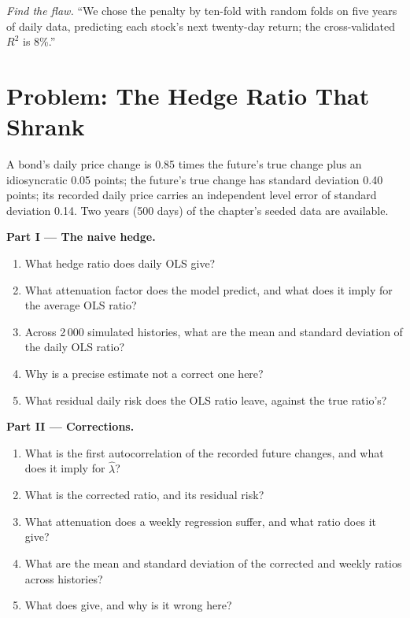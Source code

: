 \begin{exercise}[$\star\star\star$]\label{exo:qm:linear-models-under-stress:8}
\emph{Find the flaw.} ``We chose the  penalty by ten-fold  with random folds on five years of daily data, predicting each
stock's next twenty-day return; the cross-validated $R^2$ is 8\%.''
\end{exercise}

\section{Problem: The Hedge Ratio That Shrank}

\begin{problem}\label{pb:qm:linear-models-under-stress:1}
A bond's daily price change is 0.85 times the future's true change plus an idiosyncratic 0.05 points; the future's true change has standard
deviation 0.40 points; its recorded daily price carries an independent level error of standard deviation 0.14. Two years (500 days) of the
chapter's seeded data are available.

\medskip\noindent\textbf{Part I --- The naive hedge.}
\begin{enumerate}
\item What hedge ratio does daily OLS give?
\item What attenuation factor does the model predict, and what does it imply for the average OLS ratio?
\item Across 2\,000 simulated histories, what are the mean and standard deviation of the daily OLS ratio?
\item Why is a precise estimate not a correct one here?
\item What residual daily risk does the OLS ratio leave, against the true ratio's?
\end{enumerate}

\medskip\noindent\textbf{Part II --- Corrections.}
\begin{enumerate}[resume]
\item What is the first autocorrelation of the recorded future changes, and what does it imply for $\hat\lambda$?
\item What is the corrected ratio, and its residual risk?
\item What attenuation does a weekly regression suffer, and what ratio does it give?
\item What are the mean and standard deviation of the corrected and weekly ratios across histories?
\item What does  give, and why is it wrong here?
\end{enumerate}


\end{problem}
